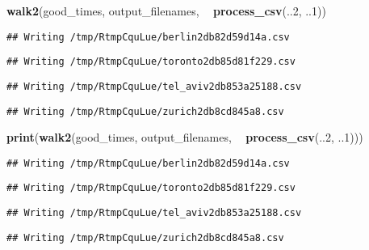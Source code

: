 \documentclass[]{book}
\newenvironment{Shaded}{\begin{snugshade}}{\end{snugshade}}
\newcommand{\DecValTok}[1]{\textcolor[rgb]{0.00,0.00,0.81}{#1}}
\newcommand{\KeywordTok}[1]{\textcolor[rgb]{0.13,0.29,0.53}{\textbf{#1}}}
\newcommand{\NormalTok}[1]{#1}
\newcommand{\OperatorTok}[1]{\textcolor[rgb]{0.81,0.36,0.00}{\textbf{#1}}}
\newcommand{\StringTok}[1]{\textcolor[rgb]{0.31,0.60,0.02}{#1}}
\begin{document}
\begin{Shaded}
\begin{Highlighting}[]
\KeywordTok{walk2}\NormalTok{(good_times, output_filenames, }\OperatorTok{~}\StringTok{ }\KeywordTok{process_csv}\NormalTok{(..}\DecValTok{2}\NormalTok{, ..}\DecValTok{1}\NormalTok{))}
\end{Highlighting}
\end{Shaded}

\begin{verbatim}
## Writing /tmp/RtmpCquLue/berlin2db82d59d14a.csv
\end{verbatim}

\begin{verbatim}
## Writing /tmp/RtmpCquLue/toronto2db85d81f229.csv
\end{verbatim}

\begin{verbatim}
## Writing /tmp/RtmpCquLue/tel_aviv2db853a25188.csv
\end{verbatim}

\begin{verbatim}
## Writing /tmp/RtmpCquLue/zurich2db8cd845a8.csv
\end{verbatim}

\begin{Shaded}
\begin{Highlighting}[]
\KeywordTok{print}\NormalTok{(}\KeywordTok{walk2}\NormalTok{(good_times, output_filenames, }\OperatorTok{~}\StringTok{ }\KeywordTok{process_csv}\NormalTok{(..}\DecValTok{2}\NormalTok{, ..}\DecValTok{1}\NormalTok{)))}
\end{Highlighting}
\end{Shaded}

\begin{verbatim}
## Writing /tmp/RtmpCquLue/berlin2db82d59d14a.csv
\end{verbatim}

\begin{verbatim}
## Writing /tmp/RtmpCquLue/toronto2db85d81f229.csv
\end{verbatim}

\begin{verbatim}
## Writing /tmp/RtmpCquLue/tel_aviv2db853a25188.csv
\end{verbatim}

\begin{verbatim}
## Writing /tmp/RtmpCquLue/zurich2db8cd845a8.csv
\end{verbatim}
\end{document}
